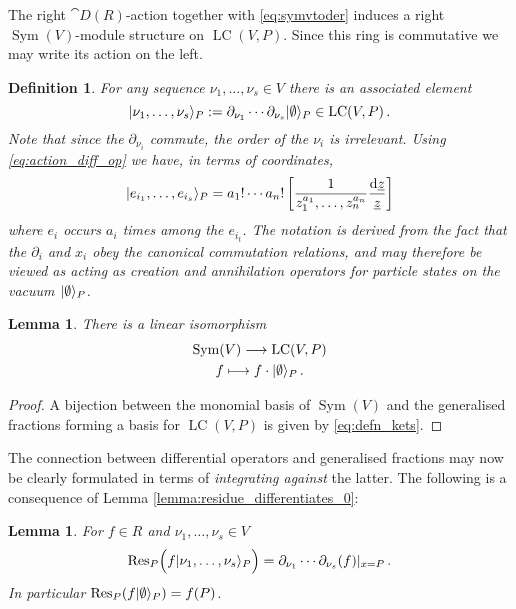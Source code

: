 \documentclass[english,letter paper,12pt,reqno]{article}
\DeclarePairedDelimiter\ket{\lvert}{\rangle}
\newtheorem{lemma}[theorem]{Lemma}
\theoremstyle{example}
\newtheorem{definition}[theorem]{Definition}
\numberwithin{equation}{section}
\def\vacu{\ket{\emptyset}}
\DeclareMathOperator{\Sym}{Sym}
\DeclareMathOperator{\LC}{LC}
\begin{document}
The right $\cat{D}(R)$-action together with \eqref{eq:symvtoder} induces a right $\Sym(V)$-module structure on $\LC(V,P)$. Since this ring is commutative we may write its action on the left.

\begin{definition} For any sequence $\nu_1,\ldots,\nu_s \in V$ there is an associated element
\begin{equation}\label{eq:s_particle_state}
\ket{ \nu_1, \ldots, \nu_s }_P := \partial_{\nu_1} \cdots \partial_{\nu_s} \vacu_P \in \LC(V,P)\,.
\end{equation}
Note that since the $\partial_{\nu_i}$ commute, the order of the $\nu_i$ is irrelevant. Using \eqref{eq:action_diff_op} we have, in terms of coordinates,
\begin{equation}\label{eq:defn_kets}
\ket{ e_{i_1}, \ldots, e_{i_s} }_P = a_1! \cdots a_n! \left[ \frac{1}{z_1^{a_1}, \ldots, z_n^{a_n}} \frac{\ud{\underline{z}}}{\underline{z}} \right]
\end{equation}
where $e_i$ occurs $a_i$ times among the $e_{i_t}$. The notation is derived from the fact that the $\partial_i$ and $x_i$ obey the canonical commutation relations, and may therefore be viewed as acting as creation and annihilation operators for particle states on the vacuum $\vacu_P$.
\end{definition}

\begin{lemma}\label{lemma:iso_fock} There is a linear isomorphism 
\begin{gather*}
\Sym(V) \lto \LC(V, P)\\
f \longmapsto f \cdot \vacu_P\,.
\end{gather*}
\end{lemma}
\begin{proof}
A bijection between the monomial basis of $\Sym(V)$ and the generalised fractions forming a basis for $\LC(V,P)$ is given by \eqref{eq:defn_kets}.
\end{proof}

The connection between differential operators and generalised fractions may now be clearly formulated in terms of \emph{integrating against} the latter. The following is a consequence of Lemma \ref{lemma:residue_differentiates_0}:

\begin{lemma}\label{lemma:residue_differentiates} For $f \in R$ and $\nu_1,\ldots,\nu_s \in V$
\begin{equation}\label{eq:residue_differentiates}
\Res_P\Big( f \ket{\nu_1,\ldots,\nu_s}_P \Big) = \partial_{\nu_1} \cdots \partial_{\nu_s}( f )|_{x = P}\,.
\end{equation}
In particular $\Res_P( f \vacu_P ) = f(P)$.
\end{lemma}
\end{document}
